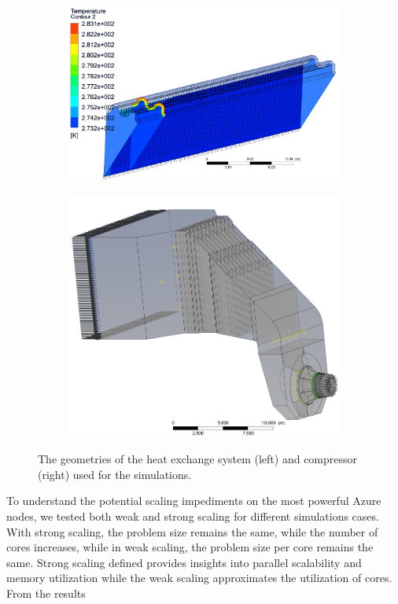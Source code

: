 \documentclass[3p,times]{elsarticle}
\begin{document}
\begin{figure}
\centering
\begin{subfigure}{.4\textwidth}
	\centering
	\includegraphics[width=\linewidth]{pipe_nobg}	
	\label{fig:pipe}
\end{subfigure}
\begin{subfigure}{.5\textwidth}
	\centering
	\includegraphics[width=.7\linewidth]{compressor_nobg}
	\label{fig:compressor}
\end{subfigure}

\caption{The geometries of the heat exchange system (left) and compressor (right) used for the simulations. }
\label{fig:cfx}
\end{figure}

To understand the potential scaling impediments on the most powerful Azure nodes, we tested both weak and strong scaling for different simulations cases. With strong scaling, the problem size remains the same, while the number of cores increases, while in weak scaling, the problem size per core remains the same. Strong scaling defined  provides insights into parallel scalability and memory utilization while the weak scaling approximates the utilization of cores. From the results 
 
\end{document}
